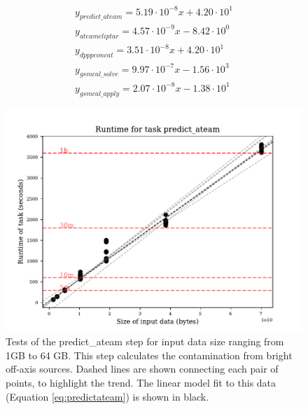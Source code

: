 \documentclass[preprint,5p]{elsarticle}
\begin{document}
\begin{subequations}
\begin{align}
        y_{predict\_ateam}=5.19\cdot10^{-8}x+4.20\cdot10^1 \label{eq:predictateam} \\
        y_{ateamcliptar}=4.57\cdot10^{-9}x-8.42\cdot10^0 \label{eq:ateamcliptar} \\
        y_{dpppconcat}=3.51\cdot10^{-8}x+4.20\cdot10^1 \label{eq:dpppconcat} \\
        y_{gsmcal\_solve}=9.97\cdot10^{-7}x-1.56\cdot10^3 \label{eq:gsmcalsolve} \\
        y_{gsmcal\_apply}=2.07\cdot10^{-8}x-1.38\cdot10^1 \label{eq:gsmcalapply}
\end{align}
\label{eq:runtime_size_models}
\end{subequations}


\begin{figure}
    \includegraphics[width=0.95\linewidth]{figures/predict_ateam_size.pdf}
      \caption{Tests of the predict\_ateam step for input data size ranging from 1GB to 64 GB. This step calculates the contamination from bright off-axis sources. Dashed lines are shown connecting each pair of points, to highlight the trend. The linear model fit to this data (Equation \ref{eq:predictateam}) is shown in black. }
	\label{fig:predict_ateam}
\end{figure}
\end{document}
